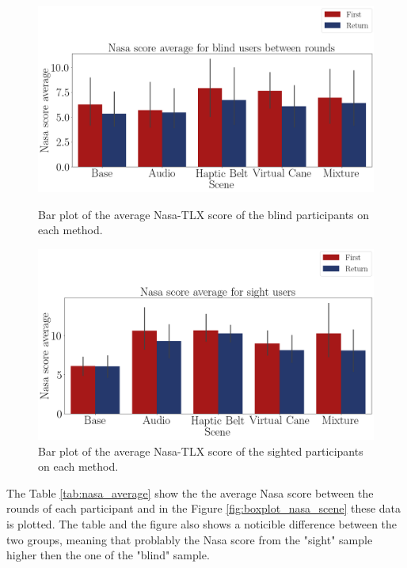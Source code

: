 

\begin{figure}[!htb]
    \centering
    \begin{minipage}{\textwidth}
        \centering
        \includegraphics[width = 0.8\linewidth]{Resultados/Nasa/Figuras/png/barplot_nasa_avg_scene_blind.png}
        \caption{Bar plot of the average Nasa-TLX score of the blind participants on each method.}
        \label{fig:barplot_nasa_scene_blind}
    \end{minipage}
    \begin{minipage}{\textwidth}
        \centering
        \includegraphics[width = 0.8\linewidth]{Resultados/Nasa/Figuras/png/barplot_nasa_avg_scene_sight.png}
        \caption{Bar plot of the average Nasa-TLX score of the sighted participants on each method.}
        \label{fig:barplot_nasa_scene_sight}
    \end{minipage}
\end{figure}


The Table \ref{tab:nasa_average} show the the average Nasa score between the rounds of each participant and in the Figure \ref{fig:boxplot_nasa_scene} these data is plotted. The table and the figure also shows a noticible difference between the two groups, meaning that problably the Nasa score from the "sight" sample higher then the one of the "blind" sample.

